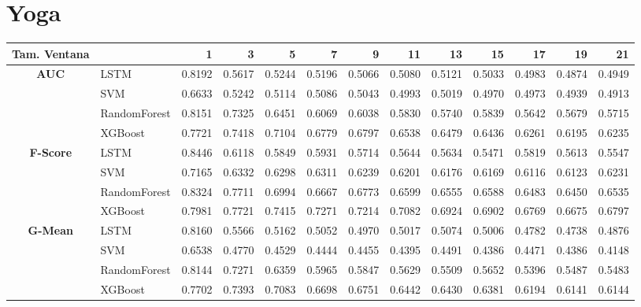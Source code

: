 \section{Yoga}
\begin{table}[h]
	\centering
	\begin{adjustbox}{max width=15cm}
		\begin{tabular}{|c|l|r|r|r|r|r|r|r|r|r|r|r|}
			\hline
			\textbf{Tam. Ventana}&         &      1  &      3  &      5  &      7  &      9  &      11 &      13 &      15 &      17 &      19 &      21 \\
			\hline
			\textbf{AUC} & LSTM &  0.8192 &  0.5617 &  0.5244 &  0.5196 &  0.5066 &  0.5080 &  0.5121 &  0.5033 &  0.4983 &  0.4874 &  0.4949 \\
			& SVM &  0.6633 &  0.5242 &  0.5114 &  0.5086 &  0.5043 &  0.4993 &  0.5019 &  0.4970 &  0.4973 &  0.4939 &  0.4913 \\
			& RandomForest &  0.8151 &  0.7325 &  0.6451 &  0.6069 &  0.6038 &  0.5830 &  0.5740 &  0.5839 &  0.5642 &  0.5679 &  0.5715 \\
			& XGBoost &  0.7721 &  0.7418 &  0.7104 &  0.6779 &  0.6797 &  0.6538 &  0.6479 &  0.6436 &  0.6261 &  0.6195 &  0.6235 \\
			\hline
			\textbf{F-Score} & LSTM &  0.8446 &  0.6118 &  0.5849 &  0.5931 &  0.5714 &  0.5644 &  0.5634 &  0.5471 &  0.5819 &  0.5613 &  0.5547 \\
			& SVM &  0.7165 &  0.6332 &  0.6298 &  0.6311 &  0.6239 &  0.6201 &  0.6176 &  0.6169 &  0.6116 &  0.6123 &  0.6231 \\
			& RandomForest &  0.8324 &  0.7711 &  0.6994 &  0.6667 &  0.6773 &  0.6599 &  0.6555 &  0.6588 &  0.6483 &  0.6450 &  0.6535 \\
			& XGBoost &  0.7981 &  0.7721 &  0.7415 &  0.7271 &  0.7214 &  0.7082 &  0.6924 &  0.6902 &  0.6769 &  0.6675 &  0.6797 \\
			\hline
			\textbf{G-Mean} & LSTM &  0.8160 &  0.5566 &  0.5162 &  0.5052 &  0.4970 &  0.5017 &  0.5074 &  0.5006 &  0.4782 &  0.4738 &  0.4876 \\
			& SVM &  0.6538 &  0.4770 &  0.4529 &  0.4444 &  0.4455 &  0.4395 &  0.4491 &  0.4386 &  0.4471 &  0.4386 &  0.4148 \\
			& RandomForest &  0.8144 &  0.7271 &  0.6359 &  0.5965 &  0.5847 &  0.5629 &  0.5509 &  0.5652 &  0.5396 &  0.5487 &  0.5483 \\
			& XGBoost &  0.7702 &  0.7393 &  0.7083 &  0.6698 &  0.6751 &  0.6442 &  0.6430 &  0.6381 &  0.6194 &  0.6141 &  0.6144 \\

\end{tabular}
\end{adjustbox}
\end{table}

